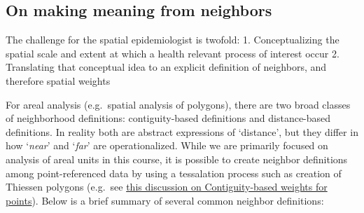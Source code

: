 \documentclass[
]{book}
\begin{document}
\hypertarget{on-making-meaning-from-neighbors}{%
\subsection{On making meaning from neighbors}\label{on-making-meaning-from-neighbors}}

The challenge for the spatial epidemiologist is twofold:
1. Conceptualizing the spatial scale and extent at which a health relevant process of interest occur
2. Translating that conceptual idea to an explicit definition of neighbors, and therefore spatial weights

For areal analysis (e.g.~spatial analysis of polygons), there are two broad classes of neighborhood definitions: contiguity-based definitions and distance-based definitions. In reality both are abstract expressions of `distance', but they differ in how `\emph{near}' and `\emph{far}' are operationalized. While we are primarily focused on analysis of areal units in this course, it is possible to create neighbor definitions among point-referenced data by using a tessalation process such as creation of Thiessen polygons (e.g.~see \href{https://geodacenter.github.io/workbook/4b_dist_weights/lab4b.html\#distance-metric}{this discussion on Contiguity-based weights for points}). Below is a brief summary of several common neighbor definitions:
\end{document}
